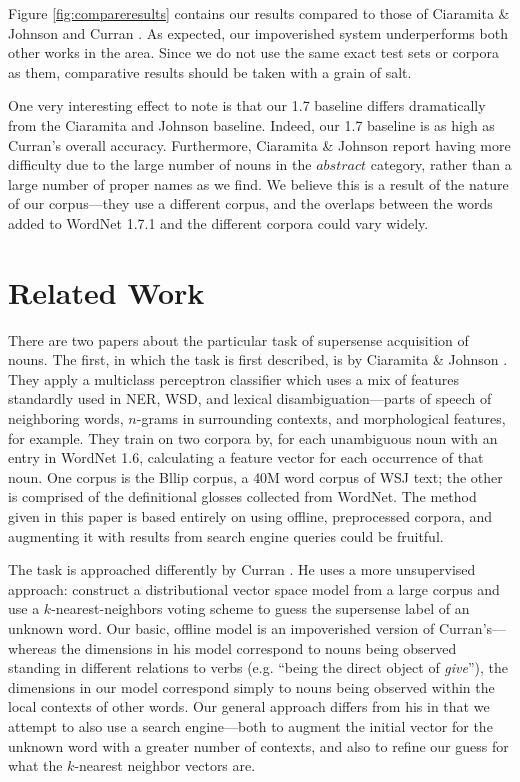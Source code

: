 \documentclass{article}
\begin{document}
Figure \ref{fig:compareresults} contains our results compared to those of Ciaramita \& Johnson \cite{cj} and Curran \cite{curran}.
As expected, our impoverished system underperforms both other works in the area.
Since we do not use the same exact test sets or corpora as them, comparative results should be taken with a grain of salt.

One very interesting effect to note is that our 1.7 baseline differs dramatically from the Ciaramita and Johnson baseline. 
Indeed, our 1.7 baseline is as high as Curran's overall accuracy.
Furthermore, Ciaramita \& Johnson report having more difficulty due to the large number of nouns in the $abstract$ category, rather than a large number of proper names as we find.
We believe this is a result of the nature of our corpus---they use a different corpus, and the overlaps between the words added to WordNet 1.7.1 and the different corpora could vary widely.


\section{Related Work}


There are two papers about the particular task of supersense acquisition of nouns.
The first, in which the task is first described, is by Ciaramita \& Johnson \cite{cj}.
They apply a multiclass perceptron classifier which uses a mix of features standardly used in NER, WSD, and lexical disambiguation---parts of speech of neighboring words, $n$-grams in surrounding contexts, and morphological features, for example.
They train on two corpora by, for each unambiguous noun with an entry in WordNet 1.6, calculating a feature vector for each occurrence of that noun.
One corpus is the Bllip corpus, a 40M word corpus of WSJ text; the other is comprised of the definitional glosses collected from WordNet.
The method given in this paper is based entirely on using offline, preprocessed corpora, and augmenting it with results from search engine queries could be fruitful.

The task is approached differently by Curran \cite{curran}.
He uses a more unsupervised approach: construct a distributional vector space model from a large corpus and use a $k$-nearest-neighbors voting scheme to guess the supersense label of an unknown word.
Our basic, offline model is an impoverished version of Curran's---whereas the dimensions in his model correspond to nouns being observed standing in different relations to verbs (e.g. ``being the direct object of {\it give}''), the dimensions in our model correspond simply to nouns being observed within the local contexts of other words.
Our general approach differs from his in that we attempt to also use a search engine---both to augment the initial vector for the unknown word with a greater number of contexts, and also to refine our guess for what the $k$-nearest neighbor vectors are.
\end{document}
